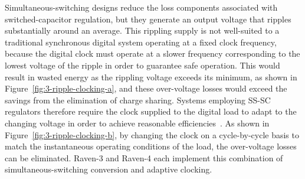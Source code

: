 \documentclass[graybox]{svmult}
\begin{document}

Simultaneous-switching designs reduce the loss components associated with switched-capacitor regulation, but they generate an output voltage that ripples substantially around an average.
This rippling supply is not well-suited to a traditional synchronous digital system operating at a fixed clock frequency, because the digital clock must operate at a slower frequency corresponding to the lowest voltage of the ripple in order to guarantee safe operation.
This would result in wasted energy as the rippling voltage exceeds its minimum, as shown in Figure~\ref{fig:3-ripple-clocking-a}, and these over-voltage losses would exceed the savings from the elimination of charge sharing.
Systems employing SS-SC regulators therefore require the clock supplied to the digital load to adapt to the changing voltage in order to achieve reasonable efficiencies~\cite{Jevtic2014}.
As shown in Figure~\ref{fig:3-ripple-clocking-b}, by changing the clock on a cycle-by-cycle basis to match the instantaneous operating conditions of the load, the over-voltage losses can be eliminated.
Raven-3 and Raven-4 each implement this combination of simultaneous-switching conversion and adaptive clocking.
\end{document}
